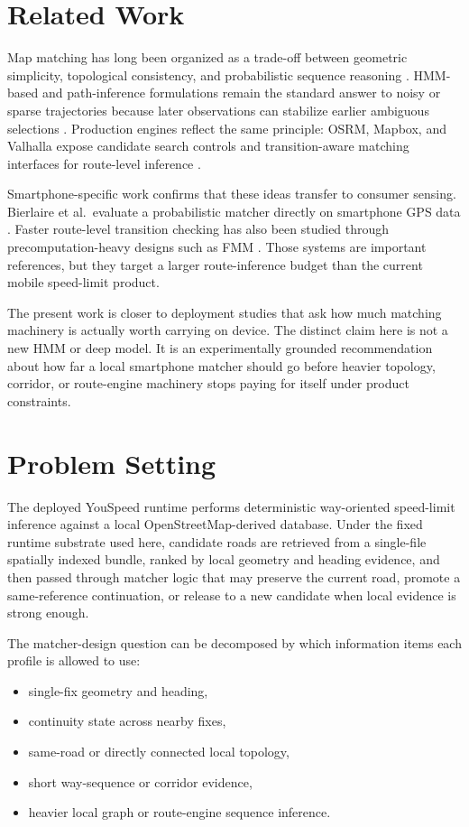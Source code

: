 \documentclass{IOS-Book-Article}
\begin{document}
\section{Related Work}
Map matching has long been organized as a trade-off between geometric simplicity, topological consistency, and probabilistic sequence reasoning \cite{quddus2007}. HMM-based and path-inference formulations remain the standard answer to noisy or sparse trajectories because later observations can stabilize earlier ambiguous selections \cite{newson2009,lou2009,goh2012,he2013,hunter2014}. Production engines reflect the same principle: OSRM, Mapbox, and Valhalla expose candidate search controls and transition-aware matching interfaces for route-level inference \cite{osrm_match_service,mapbox_map_matching_api,valhalla_meili}.

Smartphone-specific work confirms that these ideas transfer to consumer sensing. Bierlaire et al.\ evaluate a probabilistic matcher directly on smartphone GPS data \cite{bierlaire2013smartphone}. Faster route-level transition checking has also been studied through precomputation-heavy designs such as FMM \cite{yang2018fmm}. Those systems are important references, but they target a larger route-inference budget than the current mobile speed-limit product.

The present work is closer to deployment studies that ask how much matching machinery is actually worth carrying on device. The distinct claim here is not a new HMM or deep model. It is an experimentally grounded recommendation about how far a local smartphone matcher should go before heavier topology, corridor, or route-engine machinery stops paying for itself under product constraints.

\section{Problem Setting}
The deployed YouSpeed runtime performs deterministic way-oriented speed-limit inference against a local OpenStreetMap-derived database. Under the fixed runtime substrate used here, candidate roads are retrieved from a single-file spatially indexed bundle, ranked by local geometry and heading evidence, and then passed through matcher logic that may preserve the current road, promote a same-reference continuation, or release to a new candidate when local evidence is strong enough.

The matcher-design question can be decomposed by which information items each profile is allowed to use:
\begin{itemize}
\item single-fix geometry and heading,
\item continuity state across nearby fixes,
\item same-road or directly connected local topology,
\item short way-sequence or corridor evidence,
\item heavier local graph or route-engine sequence inference.
\end{itemize}
\end{document}
